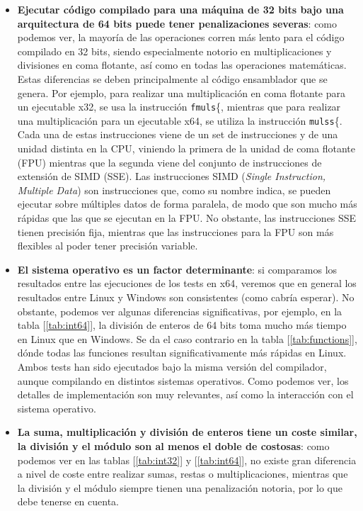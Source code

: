\begin{itemize}
	\item \textbf{Ejecutar código compilado para una máquina de 32 bits bajo una arquitectura de 64 bits puede tener penalizaciones severas}: como podemos ver, la mayoría de las operaciones corren más lento para el código compilado en 32 bits, siendo especialmente notorio en multiplicaciones y divisiones en coma flotante, así como en todas las operaciones matemáticas. Estas diferencias se deben principalmente al código ensamblador que se genera. Por ejemplo, para realizar una multiplicación en coma flotante para un ejecutable x32, se usa la instrucción \lstinline{fmuls}\{, mientras que para realizar una multiplicación para un ejecutable x64, se utiliza la instrucción \lstinline{mulss}\{. Cada una de estas instrucciones viene de un set de instrucciones y de una unidad distinta en la CPU, viniendo la primera de la unidad de coma flotante (FPU) mientras que la segunda viene del conjunto de instrucciones de extensión de SIMD (SSE). Las instrucciones SIMD (\emph{Single Instruction, Multiple Data}) son instrucciones que, como su nombre indica, se pueden ejecutar sobre múltiples datos de forma paralela, de modo que son mucho más rápidas que las que se ejecutan en la FPU. No obstante, las instrucciones SSE tienen precisión fija, mientras que las instrucciones para la FPU son más flexibles al poder tener precisión variable.
	\item \textbf{El sistema operativo es un factor determinante}: si comparamos los resultados entre las ejecuciones de los tests en x64, veremos que en general los resultados entre Linux y Windows son consistentes (como cabría esperar). No obstante, podemos ver algunas diferencias significativas, por ejemplo, en la tabla [\ref{tab:int64}], la división de enteros de 64 bits toma mucho más tiempo en Linux que en Windows. Se da el caso contrario en la tabla [\ref{tab:functions}], dónde todas las funciones resultan significativamente más rápidas en Linux. Ambos tests han sido ejecutados bajo la misma versión del compilador, aunque compilando en distintos sistemas operativos. Como podemos ver, los detalles de implementación son muy relevantes, así como la interacción con el sistema operativo.
	\item \textbf{La suma, multiplicación y división de enteros tiene un coste similar, la división y el módulo son al menos el doble de costosas}: como podemos ver en las tablas [\ref{tab:int32}] y [\ref{tab:int64}], no existe gran diferencia a nivel de coste entre realizar sumas, restas o multiplicaciones, mientras que la división y el módulo siempre tienen una penalización notoria, por lo que debe tenerse en cuenta.

\end{itemize}
